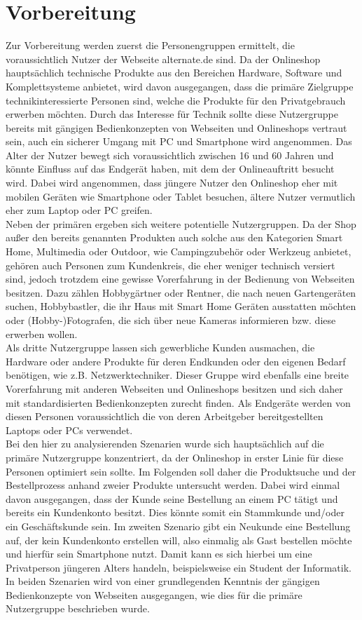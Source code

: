 \documentclass[	12pt, 
				a4paper, 
				BCOR=10mm, %
				DIV=12, 
				parskip=half, %
				headings=small, %
				twoside, %
				ngerman,
				bibliography=totoc,index=totoc, listof=totoc,
				numbers=noendperiod
				]{scrbook} %
\theoremstyle{plain}%
\theoremstyle{definition}
\theoremstyle{remark}
\begin{document}
\section{Vorbereitung}
Zur Vorbereitung werden zuerst die Personengruppen ermittelt, die voraussichtlich Nutzer der Webseite alternate.de sind. Da der Onlineshop hauptsächlich technische Produkte aus den Bereichen Hardware, Software und Komplettsysteme anbietet, wird davon ausgegangen, dass die primäre Zielgruppe technikinteressierte Personen sind, welche die Produkte für den Privatgebrauch erwerben möchten. Durch das Interesse für Technik sollte diese Nutzergruppe bereits mit gängigen Bedienkonzepten von Webseiten und Onlineshops vertraut sein, auch ein sicherer Umgang mit PC und Smartphone wird angenommen. Das Alter der Nutzer bewegt sich voraussichtlich zwischen 16 und 60 Jahren und könnte Einfluss auf das Endgerät haben, mit dem der Onlineauftritt besucht wird. Dabei wird angenommen, dass jüngere Nutzer den Onlineshop eher mit mobilen Geräten wie Smartphone oder Tablet besuchen, ältere Nutzer vermutlich eher zum Laptop oder PC greifen.\\
Neben der primären ergeben sich weitere potentielle Nutzergruppen. Da der Shop außer den bereits genannten Produkten auch solche aus den Kategorien Smart Home, Multimedia oder Outdoor, wie Campingzubehör oder Werkzeug anbietet, gehören auch Personen zum Kundenkreis, die eher weniger technisch versiert sind, jedoch trotzdem eine gewisse Vorerfahrung in der Bedienung von Webseiten besitzen. Dazu zählen Hobbygärtner oder Rentner, die nach neuen Gartengeräten suchen, Hobbybastler, die ihr Haus mit Smart Home Geräten ausstatten möchten oder (Hobby-)Fotografen, die sich über neue Kameras informieren bzw. diese erwerben wollen.\\
Als dritte Nutzergruppe lassen sich gewerbliche Kunden ausmachen, die Hardware oder andere Produkte für deren Endkunden oder den eigenen Bedarf benötigen, wie z.B. Netzwerktechniker. Dieser Gruppe wird ebenfalls eine breite Vorerfahrung mit anderen Webseiten und Onlineshops besitzen und sich daher mit standardisierten Bedienkonzepten zurecht finden. Als Endgeräte werden von diesen Personen voraussichtlich die von deren Arbeitgeber bereitgestellten Laptops oder PCs verwendet.\\
Bei den hier zu analysierenden Szenarien wurde sich hauptsächlich auf die primäre Nutzergruppe konzentriert, da der Onlineshop in erster Linie für diese Personen optimiert sein sollte. Im Folgenden soll daher die Produktsuche und der Bestellprozess anhand zweier Produkte untersucht werden. Dabei wird einmal davon ausgegangen, dass der Kunde seine Bestellung an einem PC tätigt und bereits ein Kundenkonto besitzt. Dies könnte somit ein Stammkunde und/oder ein Geschäftskunde sein. Im zweiten Szenario gibt ein Neukunde eine Bestellung auf, der kein Kundenkonto erstellen will, also einmalig als Gast bestellen möchte und hierfür sein Smartphone nutzt. Damit kann es sich hierbei um eine Privatperson jüngeren Alters handeln, beispielsweise ein Student der Informatik. In beiden Szenarien wird von einer grundlegenden Kenntnis der gängigen Bedienkonzepte von Webseiten ausgegangen, wie dies für die primäre Nutzergruppe beschrieben wurde.
\end{document}
